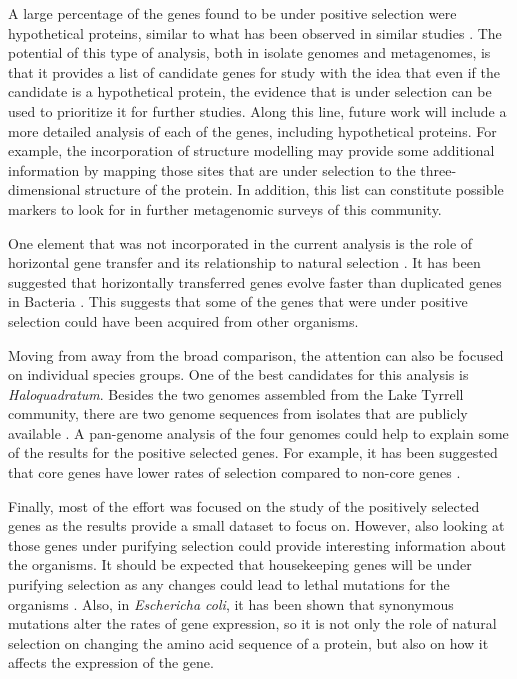 A large percentage of the genes found to be under positive selection were hypothetical proteins, similar to what has been observed in similar studies \cite{Tai:2011jo,Hemme:2010ds}. The potential of this type of analysis, both in isolate genomes and metagenomes, is that it provides a list of candidate genes for study with the idea that even if the candidate is a hypothetical protein, the evidence that is under selection can be used to prioritize it for further studies. Along this line, future work will include a more detailed analysis of each of the genes, including hypothetical proteins. For example, the incorporation of structure modelling may provide some additional information by mapping those sites that are under selection to the three-dimensional structure of the protein. In addition, this list can constitute possible markers to look for in further metagenomic surveys of this community.

One element that was not incorporated in the current analysis is the role of horizontal gene transfer and its relationship to natural selection \cite{Wiedenbeck:2011ena}. It has been suggested that horizontally transferred genes evolve faster than duplicated genes in Bacteria \cite{Treangen:2011ca}. This suggests that some of the genes that were under positive selection could have been acquired from other organisms.

Moving from away from the broad comparison, the attention can also be focused on individual species groups. One of the best candidates for this analysis is \textit{Haloquadratum}. Besides the two genomes assembled from the Lake Tyrrell community, there are two genome sequences from isolates that are publicly available \cite{Bolhuis:2006gm,DyallSmith:2011tu}. A pan-genome analysis of the four genomes could help to explain some of the results for the positive selected genes. For example, it has been suggested that core genes have lower rates of selection compared to non-core genes \cite{Jordan:2002by,RodriguezValera:2012cg}.

Finally, most of the effort was focused on the study of the positively selected genes as the results provide a small dataset to focus on. However, also looking at those genes under purifying selection could provide interesting information about the organisms. It should be expected that housekeeping genes will be under purifying selection as any changes could lead to lethal mutations for the organisms \cite{Palenik:2009kx,Schloissnig:2012hx}. Also, in \textit{Eschericha coli}, it has been shown that synonymous mutations alter the rates of gene expression, so it is not only the role of natural selection on changing the amino acid sequence of a protein, but also on how it affects the expression of the gene.

